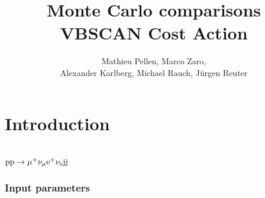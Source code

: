 \documentclass[a4paper,10pt]{report}
\title{Monte Carlo comparisons \\
VBSCAN Cost Action}
\author{Mathieu Pellen, Marco Zaro, \\
Alexander Karlberg, Michael Rauch, J\"urgen Reuter}
\begin{document}
\maketitle

\begin{abstract}

\end{abstract}

\part{Introduction}

\part{$\text{p}\text{p}\to\mu^+\nu_\mu\text{e}^+\nu_{\text{e}}\text{j}\text{j}$}

\section{Input parameters}
\end{document}
